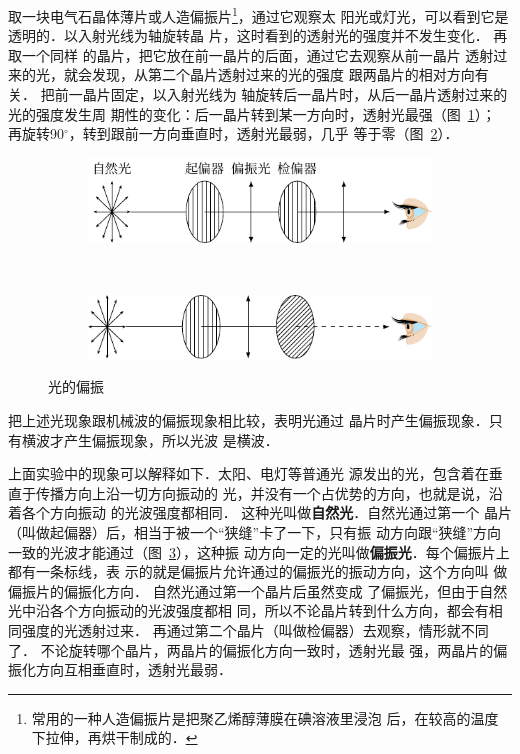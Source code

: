 取一块电气石晶体薄片或人造偏振片\footnote{常用的一种人造偏振片是把聚乙烯醇薄膜在碘溶液里浸泡
后，在较高的温度下拉伸，再烘干制成的．}，通过它观察太
阳光或灯光，可以看到它是透明的．以入射光线为轴旋转晶
片，这时看到的透射光的强度并不发生变化．
再取一个同样
的晶片，把它放在前一晶片的后面，通过它去观察从前一晶片
透射过来的光，就会发现，从第二个晶片透射过来的光的强度
跟两晶片的相对方向有关．
把前一晶片固定，以入射光线为
轴旋转后一晶片时，从后一晶片透射过来的光的强度发生周
期性的变化：后一晶片转到某一方向时，透射光最强（图~\ref{fig_C_6-13a}）；
再旋转90$^\circ$，转到跟前一方向垂直时，透射光最弱，几乎
等于零（图~\ref{fig_C_6-13b}）．
\begin{figure}[htbp]
    \centering
    \begin{subfigure}{0.8\linewidth}
        \centering
        \includegraphics{fig/C/6-13a.pdf}
        \caption{}\label{fig_C_6-13a}
    \end{subfigure}
    \\
    \begin{subfigure}{0.8\linewidth}
        \centering
        \includegraphics{fig/C/6-13b.pdf}
        \caption{}\label{fig_C_6-13b}
    \end{subfigure}
    \caption{光的偏振}\label{fig_C_6-13}
\end{figure}

把上述光现象跟机械波的偏振现象相比较，表明光通过
晶片时产生偏振现象．只有横波才产生偏振现象，所以光波
是横波．

上面实验中的现象可以解释如下．太阳、电灯等普通光
源发出的光，包含着在垂直于传播方向上沿一切方向振动的
光，并没有一个占优势的方向，也就是说，沿着各个方向振动
的光波强度都相同．
这种光叫做\textbf{自然光}．自然光通过第一个
晶片（叫做起偏器）后，相当于被一个“狭缝”卡了一下，只有振
动方向跟“狭缝”方向一致的光波才能通过（图~\ref{fig_C_6-13}），这种振
动方向一定的光叫做\textbf{偏振光}．每个偏振片上都有一条标线，表
示的就是偏振片允许通过的偏振光的振动方向，这个方向叫
做偏振片的偏振化方向．
自然光通过第一个晶片后虽然变成
了偏振光，但由于自然光中沿各个方向振动的光波强度都相
同，所以不论晶片转到什么方向，都会有相同强度的光透射过来．
再通过第二个晶片（叫做检偏器）去观察，情形就不同了．
不论旋转哪个晶片，两晶片的偏振化方向一致时，透射光最
强，两晶片的偏振化方向互相垂直时，透射光最弱．

